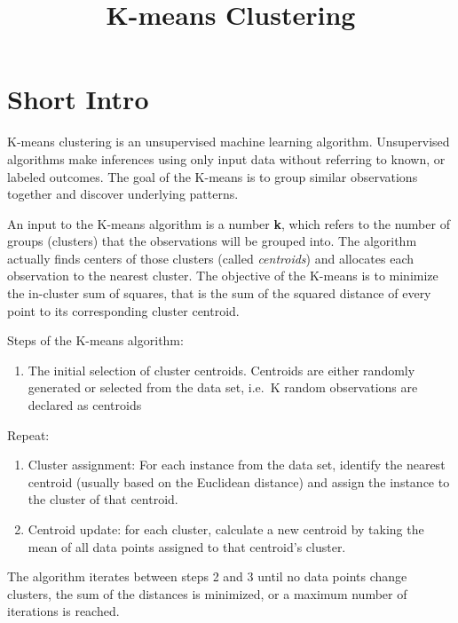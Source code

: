 \documentclass[]{article}
\title{K-means Clustering}
\author{}
\date{}
\providecommand{\tightlist}{%
  \setlength{\itemsep}{0pt}\setlength{\parskip}{0pt}}
\begin{document}
\maketitle

\section{Short Intro}\label{short-intro}

K-means clustering is an unsupervised machine learning algorithm.
Unsupervised algorithms make inferences using only input data without
referring to known, or labeled outcomes. The goal of the K-means is to
group similar observations together and discover underlying patterns.

An input to the K-means algorithm is a number \textbf{k}, which refers
to the number of groups (clusters) that the observations will be grouped
into. The algorithm actually finds centers of those clusters (called
\emph{centroids}) and allocates each observation to the nearest cluster.
The objective of the K-means is to minimize the in-cluster sum of
squares, that is the sum of the squared distance of every point to its
corresponding cluster centroid.

Steps of the K-means algorithm:

\begin{enumerate}
\def\labelenumi{\arabic{enumi})}
\tightlist
\item
  The initial selection of cluster centroids. Centroids are either
  randomly generated or selected from the data set, i.e.~K random
  observations are declared as centroids
\end{enumerate}

Repeat:

\begin{enumerate}
\def\labelenumi{\arabic{enumi})}
\setcounter{enumi}{1}
\item
  Cluster assignment: For each instance from the data set, identify the
  nearest centroid (usually based on the Euclidean distance) and assign
  the instance to the cluster of that centroid.
\item
  Centroid update: for each cluster, calculate a new centroid by taking
  the mean of all data points assigned to that centroid's cluster.
\end{enumerate}

The algorithm iterates between steps 2 and 3 until no data points change
clusters, the sum of the distances is minimized, or a maximum number of
iterations is reached.
\end{document}
